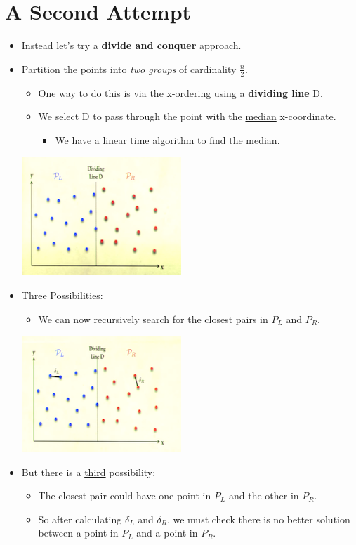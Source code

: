 \documentclass[12pt]{article}
\begin{document}
\section{A Second Attempt}
\renewcommand{\labelitemii}{$\circ$}
\renewcommand{\labelitemiii}{$\cdot$}
\renewcommand{\labelitemiii}{$\rightarrow$}
\renewcommand{\labelitemiv}{$\star$}
\begin{itemize}
\item Instead let's try a \textbf{divide and conquer} approach.
\item Partition the points into \textit{two groups} of cardinality {\large $\frac{n}{2}$}.
	\begin{itemize}
	\item One way to do this is via the x-ordering using a \textbf{dividing line} D.
	\item We select D to pass through the point with the \underline{median} x-coordinate.
		\begin{itemize}
		\item We have a linear time algorithm to find the median.
		\end{itemize}
	\end{itemize}
\begin{center}
\includegraphics{lecture65}
\end{center}
\item Three Possibilities: 
	\begin{itemize}
	\item We can now recursively search for the closest pairs in $P_L$ and $P_R$.
	\end{itemize}
\begin{center}
\includegraphics{lecture66}
\end{center}
\item But there is a \underline{third} possibility:
	\begin{itemize}
	\item The closest pair could have one point in $P_L$ and the other in $P_R$.
	\item So after calculating $\delta_L$ and $\delta_R$, we must check there is no better solution between a point in $P_L$ and a point in $P_R$.
	\end{itemize}
\end{itemize}
\end{document}
